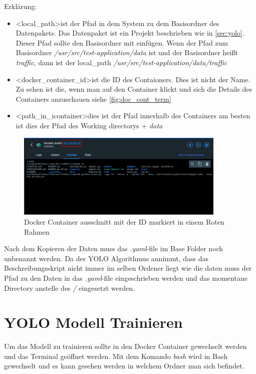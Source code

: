 Erklärung:
\begin{itemize}
    \item \textless local\_path\textgreater ist der Pfad in dem System zu dem Basisordner des Datenpakets. Das Datenpaket ist ein Projekt beschrieben wie in \autoref{sec:yolo}. Dieser Pfad sollte den Basisordner mit einfügen. Wenn der Pfad zum Basisordner \textit{/usr/src/test-application/data} ist und der Basisordner heißt \textit{traffic}, dann ist der local\_path \textit{/usr/src/test-application/data/traffic}
    \item \textless docker\_container\_id\textgreater ist die ID des Contaioners. Dies ist nicht der Name. Zu sehen ist die, wenn man auf den Container klickt und sich die Details des Containers anzuschauen siehe \autoref{fig:doc_cont_term}
    \item \textless path\_in\_icontainer\textgreater dies ist der Pfad innerhalb des Containers am besten ist dies der Pfad des Working directorys + \textit{data}
\end{itemize}

\begin{figure}
    \centering
    \includegraphics[width=10cm]{data/img/docker_container_terminal.png}
    \caption{Docker Container ausschnitt mit der ID markiert in einem Roten Rahmen}
    \label{fig:doc_cont_term}
\end{figure}

Nach dem Kopieren der Daten muss das \textit{.yaml}-file im Base Folder noch unbenannt werden. Da der YOLO Algorithmus annimmt, dass das Beschreibungsskript nicht immer im selben Ordener liegt wie die daten muss der Pfad zu den Daten in das \textit{.yaml}-file eingeschrieben werden und das momentane Directory anstelle des \textit{/} eingesetzt werden.
\section{YOLO Modell Trainieren}
Um das Modell zu trainieren sollte in den Docker Container gewechselt werden und das Terminal geöffnet werden. Mit dem Komando \textit{bash} wird in Bash gewechselt und es kann gesehen werden in welchem Ordner man sich befindet. 
